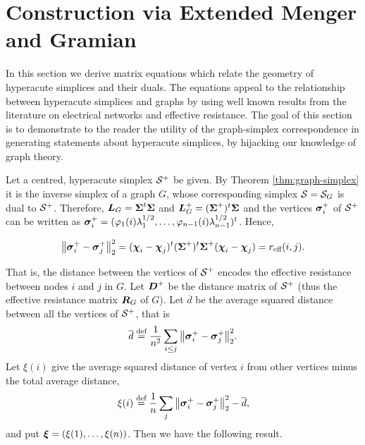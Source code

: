 \section{Construction via Extended Menger and Gramian}
In this section we derive matrix equations which relate the geometry of hyperacute simplices and their duals. The equations appeal to the relationship between hyperacute simplices and graphs by using well known results from the literature on electrical networks and effective resistance. The goal of this section is to demonstrate to the reader the utility of the graph-simplex correspondence in generating statements about hyperacute simplices, by hijacking our knowledge of graph theory. 

Let a centred, hyperacute simplex $\mathcal{S}^+$ be given. By Theorem \ref{thm:graph-simplex} it is the inverse simplex of a graph $G$, whose corresponding simplex $\mathcal{S} = \mathcal{S}_G$ is dual to $\mathcal{S}^+$.
Therefore, $\vb*{L}_G=\boldsymbol{\Sigma}^t\boldsymbol{\Sigma}$ and $\vb*{L}_G^+=(\boldsymbol{\Sigma}^+)^t\boldsymbol{\Sigma}$ and the vertices $\vb*{\sigma}_i^+$ of $\mathcal{S}^+$ can be written as $\vb*{\sigma}_i^+=(\varphi_1(i)\lambda_1^{1/2},\dots,\varphi_{n-1}(i)\lambda_{n-1}^{1/2})^t$. Hence, 

\begin{align*}
\norm{\vb*{\sigma}_i^+-\vb*{\sigma}_j^+}_2^2 = (\boldsymbol{\chi}_i-\boldsymbol{\chi}_j)^t (\boldsymbol{\Sigma}^+)^t\boldsymbol{\Sigma}^+ (\boldsymbol{\chi}_i-\boldsymbol{\chi}_j) = r_{\text{eff}}(i,j).
\end{align*}

That is, the distance between the vertices of $\mathcal{S}^+$ encodes the effective resistance between nodes $i$ and $j$ in $G$. Let $\vb*{D}^+$ be the distance matrix of $\mathcal{S}^+$ (thus the effective resistance matrix $\vb*{R}_G$ of $G$). Let $\overline{d}$ be the average squared distance between all the vertices of $\mathcal{S}^+$, that is
\[\overline{d} \overset{\text{def}}{=}  \frac{1}{n^2}\sum_{i\leq j} \norm{\vb*{\sigma}_i^+-\vb*{\sigma}_j^+}_2^2.\]
Let $\xi(i)$ give the average squared distance of vertex $i$ from other vertices minus the total average distance, 
\[\xi(i) \overset{\text{def}}{=} \frac{1}{n}\sum_{j} \norm{\vb*{\sigma}_i^+-\vb*{\sigma}_j^+}_2^2 - \overline{d},\]
and put $\vb*{\xi}=(\xi(1),\dots,\xi(n))$. 
Then we have the following result. 

